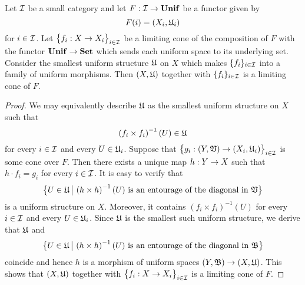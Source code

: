 \begin{theorem}\label{theorem:limits_of_uniform_spaces_description}
Let ${\mathcal I}$ be a small category and let $F:{\mathcal I}\rightarrow \mathbf{Unif}$ be a functor given by
$$F(i) = (X_i,{\mathfrak U}_i)$$
for $i\in {\mathcal I}$. Let $\big\{f_i:X \rightarrow X_i \big\}_{i\in {\mathcal I}}$ be a limiting cone of the composition of $F$ with the functor $\mathbf{Unif} \rightarrow \mathbf{Set}$ which sends each uniform space to its underlying set. Consider the smallest uniform structure ${\mathfrak U}$ on $X$ which makes $\{f_i\}_{i\in {\mathcal I}}$ into a family of uniform morphisms. Then $(X,{\mathfrak U})$ together with $\{f_i\}_{i\in {\mathcal I}}$ is a limiting cone of $F$.
\end{theorem}
\begin{proof}
We may equivalently describe ${\mathfrak U}$ as the smallest uniform structure on $X$ such that 
$$\left(f_i\times f_i\right)^{-1}(U) \in {\mathfrak U}$$
for every $i\in {\mathcal I}$ and every $U \in {\mathfrak U}_i$. Suppose that $\big\{g_i:(Y,{\mathfrak V}) \rightarrow (X_i,{\mathfrak U}_i)\big\}_{i\in {\mathcal I}}$ is some cone over $F$. Then there exists a unique map $h:Y \rightarrow X$ such that $h\cdot f_i = g_i$ for every $i\in {\mathcal I}$. It is easy to verify that
$$\big\{U\in {\mathfrak U}\,\big|\,\left(h\times h\right)^{-1}(U)\mbox{ is an entourage of the diagonal in }{\mathfrak V}\big\}$$
is a uniform structure on $X$. Moreover, it contains $\left(f_i\times f_i\right)^{-1}(U)$ for every $i\in {\mathcal I}$ and every $U \in {\mathfrak U}_i$. Since ${\mathfrak U}$ is the smallest such uniform structure, we derive that ${\mathfrak U}$ and
$$\big\{U\in {\mathfrak U}\,\big|\,\left(h\times h\right)^{-1}(U)\mbox{ is an entourage of the diagonal in }{\mathfrak B}\big\}$$
coincide and hence $h$ is a morphism of uniform spaces $\left(Y,{\mathfrak B}\right) \rightarrow \left(X,{\mathfrak U}\right)$. This shows that $(X,{\mathfrak U})$ together with $\big\{f_i:X \rightarrow X_i\big\}_{i\in {\mathcal I}}$ is a limiting cone of $F$.
\end{proof}

